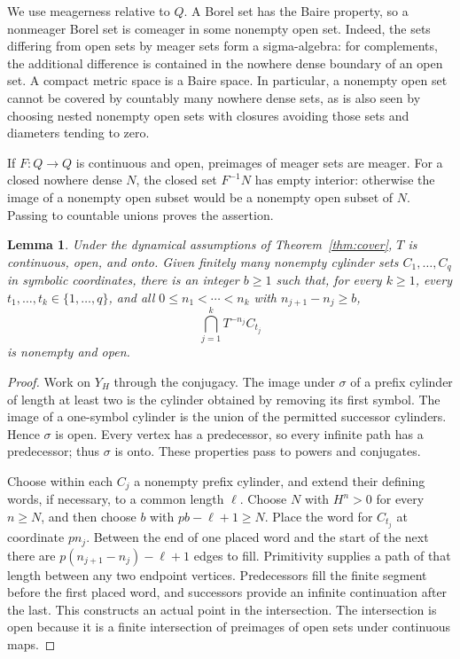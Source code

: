 \documentclass[11pt,reqno]{amsart}
\numberwithin{equation}{section}
\newtheorem{lemma}[theorem]{Lemma}
\theoremstyle{definition}
\theoremstyle{remark}
\begin{document}
We use meagerness relative to $Q$. A Borel set has the Baire property,
so a nonmeager Borel set is comeager in some nonempty open set. Indeed,
the sets differing from open sets by meager sets form a sigma-algebra:
for complements, the additional difference is contained in the
nowhere dense boundary of an open set. A compact metric space is a
Baire space. In particular, a nonempty open set cannot be covered by
countably many nowhere dense sets, as is also seen by choosing nested
nonempty open sets with closures avoiding those sets and diameters
tending to zero.

If $F:Q\to Q$ is continuous and open, preimages of meager sets are
meager. For a closed nowhere dense $N$, the closed set $F^{-1}N$ has
empty interior: otherwise the image of a nonempty open subset would be
a nonempty open subset of $N$. Passing to countable unions proves the
assertion.

\begin{lemma}\label{lem:glue}
Under the dynamical assumptions of Theorem~\ref{thm:cover}, $T$ is
continuous, open, and onto. Given finitely many nonempty cylinder sets
$C_1,\ldots,C_q$ in symbolic coordinates, there is an integer $b\ge1$
such that, for every $k\ge1$, every $t_1,\ldots,t_k\in\{1,\ldots,q\}$,
and all $0\le n_1<\cdots<n_k$ with $n_{j+1}-n_j\ge b$,
\[
 \bigcap_{j=1}^k T^{-n_j}C_{t_j}
\]
is nonempty and open.
\end{lemma}
\begin{proof}
Work on $Y_H$ through the conjugacy. The image under $\sigma$ of a
prefix cylinder of length at least two is the cylinder obtained by
removing its first symbol. The image of a one-symbol cylinder is the
union of the permitted successor cylinders. Hence $\sigma$ is open.
Every vertex has a predecessor, so every infinite path has a predecessor;
thus $\sigma$ is onto. These properties pass to powers and conjugates.

Choose within each $C_j$ a nonempty prefix cylinder, and extend their
defining words, if necessary, to a common length $\ell$. Choose $N$ with
$H^n>0$ for every $n\ge N$, and then choose $b$ with
$pb-\ell+1\ge N$. Place the word for $C_{t_j}$ at coordinate $pn_j$.
Between the end of one placed word and the start of the next there are
$p(n_{j+1}-n_j)-\ell+1$ edges to fill. Primitivity supplies a path of
that length between any two endpoint vertices. Predecessors fill the
finite segment before the first placed word, and successors provide an
infinite continuation after the last. This constructs an actual point
in the intersection. The intersection is open because it is a finite
intersection of preimages of open sets under continuous maps.
\end{proof}
\end{document}
